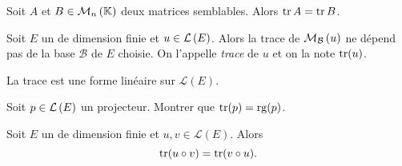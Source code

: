 \documentclass{magnolia}
\begin{document}
\begin{proposition}[utile=2]
Soit $A$ et $B\in\mathcal{M}_{n}\left(\mathbb{K}\right)$ deux matrices semblables. Alors $\operatorname{tr} A=\operatorname{tr} B$.
\end{proposition}

\begin{definition}[utile=-3]
Soit $E$ un \Kev de dimension finie et $u\in\mathcal{L}\left(E\right)$. Alors la trace de
$\mathcal{M}_{\mathcal{B}}\left(u\right)$ ne dépend pas de la
base $\mathcal{B}$ de $E$ choisie. On l'appelle \emph{trace} de $u$ et on la note $\operatorname{tr}(u)$.
\end{definition}

\begin{remarqueUnique}
\remarque La trace est une forme linéaire sur $\mathcal{L}(E)$.
\end{remarqueUnique}

\begin{exoUnique}
\exo Soit $p\in\mathcal{L}\left(E\right)$ un projecteur. Montrer que $\operatorname{tr}(p)=\operatorname{rg}(p)$.  
\end{exoUnique}

\begin{proposition}
Soit $E$ un \Kev de dimension finie et $u,v\in\mathcal{L}(E)$. Alors
\[\operatorname{tr}(u\circ v)=\operatorname{tr}(v\circ u).\]
\end{proposition}

\end{document}
